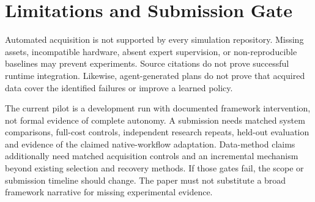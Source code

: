 \documentclass[10pt,twocolumn,letterpaper]{article}
\begin{document}
\section{Limitations and Submission Gate}
Automated acquisition is not supported by every simulation repository. Missing
assets, incompatible hardware, absent expert supervision, or non-reproducible
baselines may prevent experiments. Source citations do not prove successful
runtime integration. Likewise, agent-generated plans do not prove that acquired
data cover the identified failures or improve a learned policy.

The current pilot is a development run with documented framework intervention,
not formal evidence of complete autonomy. A submission needs matched system
comparisons, full-cost controls, independent research repeats, held-out evaluation
and evidence of the claimed native-workflow adaptation. Data-method claims
additionally need matched acquisition controls and an incremental mechanism
beyond existing selection and recovery methods.
If those gates fail, the scope or submission timeline should change. The paper
must not substitute a broad framework narrative for missing experimental evidence.

{\small


}
\end{document}
